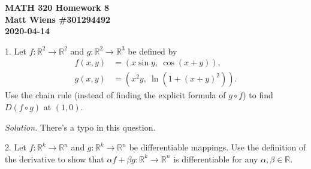 \documentclass{article}
\newcommand{\0}{\mathbf{0}}
\newcommand{\R}{\mathbb{R}}
\begin{document}
\textbf{MATH 320 Homework 8} \\
\textbf{Matt Wiens \#301294492} \\
\textbf{2020-04-14}

1. Let $f: \R^2 \to \R^2$ and $g: \R^2 \to \R^3$ be defined by
%
\begin{align*}
    f(x, y) &= (x \sin y, \ \cos(x+y)), \\
    g(x, y) &= (x^2 y, \ \ln (1+(x+y)^2))
    .
\end{align*}
%
Use the chain rule (instead of finding the explicit formula of $g \circ
f$) to find $D(f \circ g)$ at $(1, 0)$.

\textit{Solution.}
There's a typo in this question.

\newpage

2. Let $f: \R^k \to \R^n$ and $g: \R^k \to \R^n$ be differentiable
mappings. Use the definition of the derivative to show that $\alpha f
+ \beta g: \R^k \to \R^n$ is differentiable for any $\alpha, \beta
\in \R$.
\end{document}
